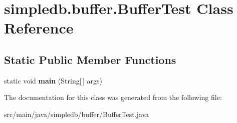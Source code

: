 \hypertarget{classsimpledb_1_1buffer_1_1BufferTest}{}\section{simpledb.\+buffer.\+Buffer\+Test Class Reference}
\label{classsimpledb_1_1buffer_1_1BufferTest}
\subsection*{Static Public Member Functions}
\begin{DoxyCompactItemize}
\item 
\mbox{\label{classsimpledb_1_1buffer_1_1BufferTest_a84f8b10a052548d6473a2e263df8830c}} 
static void {\bfseries main} (String\mbox{[}$\,$\mbox{]} args)
\end{DoxyCompactItemize}


The documentation for this class was generated from the following file\+:\begin{DoxyCompactItemize}
\item 
src/main/java/simpledb/buffer/Buffer\+Test.\+java\end{DoxyCompactItemize}
